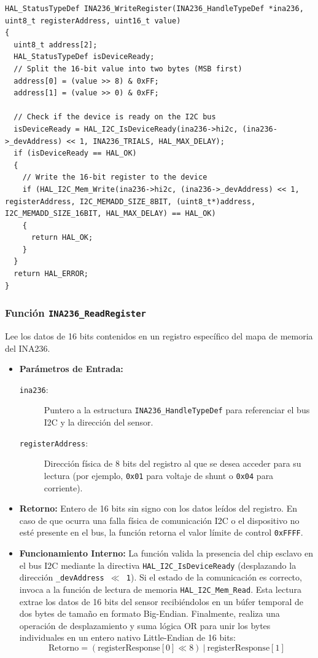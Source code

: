 \documentclass[
10pt, %
a4paper, %
oneside, %
headinclude,footinclude, %
BCOR5mm, %
]{scrartcl}
\begin{document}
\begin{lstlisting}[style=CMakeStyle]
HAL_StatusTypeDef INA236_WriteRegister(INA236_HandleTypeDef *ina236, uint8_t registerAddress, uint16_t value)
{
  uint8_t address[2];
  HAL_StatusTypeDef isDeviceReady;
  // Split the 16-bit value into two bytes (MSB first)
  address[0] = (value >> 8) & 0xFF;
  address[1] = (value >> 0) & 0xFF;
  
  // Check if the device is ready on the I2C bus
  isDeviceReady = HAL_I2C_IsDeviceReady(ina236->hi2c, (ina236->_devAddress) << 1, INA236_TRIALS, HAL_MAX_DELAY);
  if (isDeviceReady == HAL_OK)
  {
    // Write the 16-bit register to the device
    if (HAL_I2C_Mem_Write(ina236->hi2c, (ina236->_devAddress) << 1, registerAddress, I2C_MEMADD_SIZE_8BIT, (uint8_t*)address, I2C_MEMADD_SIZE_16BIT, HAL_MAX_DELAY) == HAL_OK)
    {
      return HAL_OK;
    }
  }
  return HAL_ERROR;
}
\end{lstlisting}

\subsubsection{Función \texttt{INA236\_ReadRegister}}
Lee los datos de 16 bits contenidos en un registro específico del mapa de memoria del INA236.

\begin{itemize}
	\item \textbf{Parámetros de Entrada:}
		\begin{description}
			\item[\texttt{ina236}:] Puntero a la estructura \texttt{INA236\_HandleTypeDef} para referenciar el bus I2C y la dirección del sensor.
			\item[\texttt{registerAddress}:] Dirección física de 8 bits del registro al que se desea acceder para su lectura (por ejemplo, \texttt{0x01} para voltaje de shunt o \texttt{0x04} para corriente).
		\end{description}
	\item \textbf{Retorno:} Entero de 16 bits sin signo con los datos leídos del registro. En caso de que ocurra una falla física de comunicación I2C o el dispositivo no esté presente en el bus, la función retorna el valor límite de control \texttt{0xFFFF}.
	\item \textbf{Funcionamiento Interno:}
		La función valida la presencia del chip esclavo en el bus I2C mediante la directiva \texttt{HAL\_I2C\_IsDeviceReady} (desplazando la dirección \texttt{\_devAddress $\ll$ 1}). Si el estado de la comunicación es correcto, invoca a la función de lectura de memoria \texttt{HAL\_I2C\_Mem\_Read}. Esta lectura extrae los datos de 16 bits del sensor recibiéndolos en un búfer temporal de dos bytes de tamaño en formato Big-Endian. Finalmente, realiza una operación de desplazamiento y suma lógica OR para unir los bytes individuales en un entero nativo Little-Endian de 16 bits:
		\begin{equation}
			\text{Retorno} = (\text{registerResponse}[0] \ll 8) \ | \ \text{registerResponse}[1]
		\end{equation}
\end{itemize}
\end{document}
